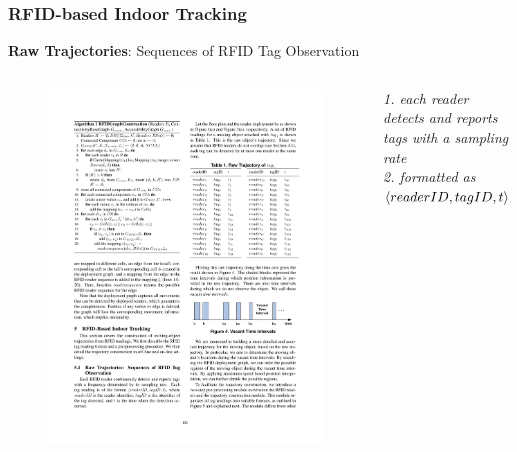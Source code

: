 \begin{frame}
\end{frame}


\begin{frame}
\frametitle{RFID-based Indoor Tracking}

  \small{\textbf{Raw Trajectories}: \textrm{Sequences of RFID Tag Observation}}

  \begin{columns}[c]

    \begin{figure}[tb]
      \includegraphics[width=\columnwidth]{figures/2-1-6.pdf}
    \end{figure}
    \scriptsize\textit{
      1. each reader detects and reports tags with a sampling rate \\
      2. formatted as $\mathnormal{\langle readerID, tagID, t \rangle}$
    }


\end{columns}
\end{frame}
